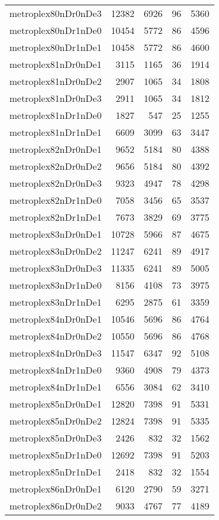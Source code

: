 \begin{longtable}{lrrrr}
metroplex80nDr0nDe3 & 12382 & 6926 & 96 & 5360 \\
metroplex80nDr1nDe0 & 10454 & 5772 & 86 & 4596 \\
metroplex80nDr1nDe1 & 10458 & 5772 & 86 & 4600 \\
metroplex81nDr0nDe1 & 3115 & 1165 & 36 & 1914 \\
metroplex81nDr0nDe2 & 2907 & 1065 & 34 & 1808 \\
metroplex81nDr0nDe3 & 2911 & 1065 & 34 & 1812 \\
metroplex81nDr1nDe0 & 1827 & 547 & 25 & 1255 \\
metroplex81nDr1nDe1 & 6609 & 3099 & 63 & 3447 \\
metroplex82nDr0nDe1 & 9652 & 5184 & 80 & 4388 \\
metroplex82nDr0nDe2 & 9656 & 5184 & 80 & 4392 \\
metroplex82nDr0nDe3 & 9323 & 4947 & 78 & 4298 \\
metroplex82nDr1nDe0 & 7058 & 3456 & 65 & 3537 \\
metroplex82nDr1nDe1 & 7673 & 3829 & 69 & 3775 \\
metroplex83nDr0nDe1 & 10728 & 5966 & 87 & 4675 \\
metroplex83nDr0nDe2 & 11247 & 6241 & 89 & 4917 \\
metroplex83nDr0nDe3 & 11335 & 6241 & 89 & 5005 \\
metroplex83nDr1nDe0 & 8156 & 4108 & 73 & 3975 \\
metroplex83nDr1nDe1 & 6295 & 2875 & 61 & 3359 \\
metroplex84nDr0nDe1 & 10546 & 5696 & 86 & 4764 \\
metroplex84nDr0nDe2 & 10550 & 5696 & 86 & 4768 \\
metroplex84nDr0nDe3 & 11547 & 6347 & 92 & 5108 \\
metroplex84nDr1nDe0 & 9360 & 4908 & 79 & 4373 \\
metroplex84nDr1nDe1 & 6556 & 3084 & 62 & 3410 \\
metroplex85nDr0nDe1 & 12820 & 7398 & 91 & 5331 \\
metroplex85nDr0nDe2 & 12824 & 7398 & 91 & 5335 \\
metroplex85nDr0nDe3 & 2426 & 832 & 32 & 1562 \\
metroplex85nDr1nDe0 & 12692 & 7398 & 91 & 5203 \\
metroplex85nDr1nDe1 & 2418 & 832 & 32 & 1554 \\
metroplex86nDr0nDe1 & 6120 & 2790 & 59 & 3271 \\
metroplex86nDr0nDe2 & 9033 & 4767 & 77 & 4189 \\

\end{longtable}
